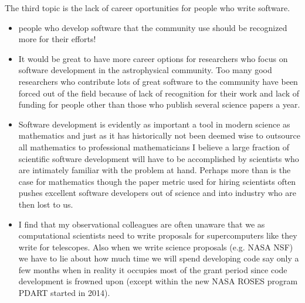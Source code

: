 The third topic is the lack of career oportunities for people who write software.
\begin{itemize}
\item{people who develop software that the community use should be recognized more for their efforts!}
\item{It would be great to have more career options for researchers who focus on software development in the astrophysical community.  Too many good researchers who contribute lots of great software to the community have been forced out of the field because of lack of recognition for their work and lack of funding for people other than those who publish several science papers a year.}
\item{Software development is evidently as important a tool in modern science as mathematics and just as it has historically not been deemed wise to outsource all mathematics to professional mathematicians I believe a large fraction of scientific software development will have to be accomplished by scientists who are intimately familiar with the problem at hand. Perhaps more than is the case for mathematics though the paper metric used for hiring scientists often pushes excellent software developers out of science and into industry who are then lost to us.}
\item{I find that my observational colleagues are often unaware that we as computational scientists need to write proposals for supercomputers like they write for telescopes.  Also when we write science proposals (e.g. NASA NSF) we have to lie about how much time we will spend developing code say only a few months when in reality it occupies most of the grant period since code development is frowned upon (except within the new NASA ROSES program PDART started in 2014).}
\end{itemize}
